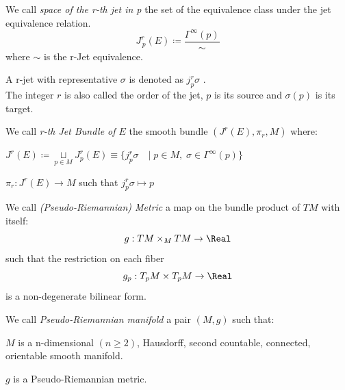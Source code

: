 \documentclass[a4paper,10pt,smallheadings]{scrartcl}
\begin{document}
		\begin{definition}
			We call \emph{space of the r-th jet in p} the set of the equivalence class under the jet equivalence relation.
			\begin{displaymath}
				J^r_{\,p}(E) \coloneqq \frac{\Gamma^\infty(p)}{\sim}
			\end{displaymath}
			where $\sim$ is the r-Jet equivalence.
		\end{definition}
		\begin{notationfix}
			A r-jet with representative $\sigma$ is denoted as $j^r_p\sigma$ .
			\\
			The integer $r$ is also called the order of the jet, $p$ is its source and $\sigma(p)$ is its target.
		\end{notationfix}

		\begin{definition}
			We call \emph{r-th Jet Bundle of $E$} the smooth bundle $(J^r(E), \pi_r, M)$	where:
			\begin{compactitemize}
				\item $J^r(E) \coloneqq \underset{p \in M}{\sqcup} J^r_p (E)
					 \equiv \big\{j^r_p\sigma \quad \vert \; p\in M, \; \sigma \in \Gamma^\infty(p) \big\}$
				\item $\pi_r: J^r(E) \rightarrow M$ such that $j^{r}_{p}\sigma \mapsto p $
			\end{compactitemize}
		\end{definition}					
					

			\begin{definition}
				We call \emph{(Pseudo-Riemannian) Metric} a map on the bundle product of $TM$ with itself:
				$$g: TM \times_M TM \rightarrow \Real$$
				such that the restriction on each fiber $$g_p: T_pM \times T_pM \rightarrow \Real $$ is a non-degenerate bilinear form.
			\end{definition}

			\begin{definition}
				We call \emph{Pseudo-Riemannian manifold} a pair $(M, g)$ such that:
				\begin{compactitemize}
					\item $M$ is a n-dimensional $(n\geq2)$, Hausdorff, second countable, connected, orientable smooth manifold.
					\item $g$ is a Pseudo-Riemannian metric.
				\end{compactitemize}
			\end{definition}					
	
\end{document}
